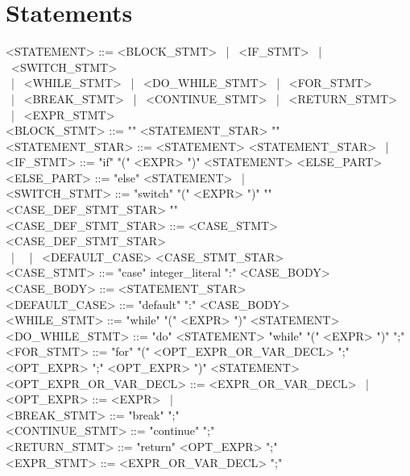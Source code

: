 \section{Statements}
\begin{grammar}
<STATEMENT> ::= <BLOCK_STMT> \ | \ <IF_STMT> \ | \ <SWITCH_STMT> \\
    \ | \ <WHILE_STMT> \ | \ <DO_WHILE_STMT> \ | \ <FOR_STMT> \\
    \ | \ <BREAK_STMT> \ | \ <CONTINUE_STMT> \ | \ <RETURN_STMT> \\
    \ | \ <EXPR_STMT> \\

<BLOCK_STMT> ::= "{" <STATEMENT_STAR> "}" \\

<STATEMENT_STAR> ::= <STATEMENT> <STATEMENT_STAR> \ | \ \epsilon \\

<IF_STMT> ::= "if" "(" <EXPR> ")" <STATEMENT> <ELSE_PART> \\

<ELSE_PART> ::= "else" <STATEMENT> \ | \ \epsilon \\

<SWITCH_STMT> ::= "switch" "(" <EXPR> ")" "{" <CASE_DEF_STMT_STAR> "}" \\

<CASE_DEF_STMT_STAR> ::= <CASE_STMT> <CASE_DEF_STMT_STAR> \\
    \ | \ \epsilon \ | \ <DEFAULT_CASE> <CASE_STMT_STAR> \\

<CASE_STMT> ::= "case" integer_literal ":" <CASE_BODY> \\

<CASE_BODY> ::= <STATEMENT_STAR> \\

<DEFAULT_CASE> ::= "default" ":" <CASE_BODY> \\

<WHILE_STMT> ::= "while" "(" <EXPR> ")" <STATEMENT> \\

<DO_WHILE_STMT> ::= "do" <STATEMENT> "while" "(" <EXPR> ")" ";" \\

<FOR_STMT> ::= "for" "(" <OPT_EXPR_OR_VAR_DECL> ";" <OPT_EXPR> ";" <OPT_EXPR> ")" <STATEMENT> \\

<OPT_EXPR_OR_VAR_DECL> ::= <EXPR_OR_VAR_DECL> \ | \ \epsilon \\

<OPT_EXPR> ::= <EXPR> \ | \ \epsilon \\

<BREAK_STMT> ::= "break" ";" \\

<CONTINUE_STMT> ::= "continue" ";" \\

<RETURN_STMT> ::= "return" <OPT_EXPR> ";" \\

<EXPR_STMT> ::= <EXPR_OR_VAR_DECL> ";"
\end{grammar}

